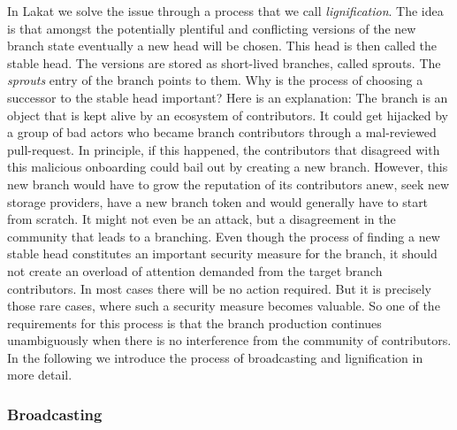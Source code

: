 \documentclass[14pt]{article}
\begin{document}
In Lakat we solve the issue through a process that we call \textit{lignification}. The idea is that amongst the potentially plentiful and conflicting versions of the new branch state eventually a new head will be chosen. This head is then called the stable head. The versions are stored as short-lived branches, called sprouts. The \textit{sprouts} entry of the branch points to them. Why is the process of choosing a successor to the stable head important? Here is an explanation: The branch is an object that is kept alive by an ecosystem of contributors. It could get hijacked by a group of bad actors who became branch contributors through a mal-reviewed pull-request. In principle, if this happened, the contributors that disagreed with this malicious onboarding could bail out by creating a new branch. However, this new branch would have to grow the reputation of its contributors anew, seek new storage providers, have a new branch token and would generally have to start from scratch. It might not even be an attack, but a disagreement in the community that leads to a branching.
Even though the process of finding a new stable head constitutes an important security measure for the branch, it should not create an overload of attention demanded from the target branch contributors. In most cases there will be no action required. But it is precisely those rare cases, where such a security measure becomes valuable. So one of the requirements for this process is that the branch production continues unambiguously when there is no interference from the community of contributors. In the following we introduce the process of broadcasting and lignification in more detail.

\subsubsection*{Broadcasting}
\end{document}
